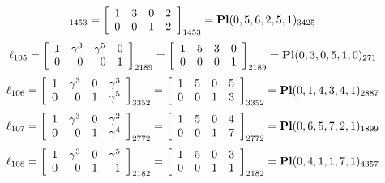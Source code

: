 \documentclass{article}
\begin{document}
{$$_{1453}
=
\left[
\begin{array}{*{4}c}
1  & 3  & 0  & 2\\
0  & 0  & 1  & 2\\
\end{array}
\right]_{1453}
={\rm\bf Pl}(0,5,6,2,5,1 )_{3425}$$
$$
\ell_{105} = 
\left[
\begin{array}{*{4}{r}}
1 & \gamma^{3} & \gamma^{5} & 0\\
0 & 0 & 0 & 1\\
\end{array}
\right]
_{2189}
=
\left[
\begin{array}{*{4}c}
1  & 5  & 3  & 0\\
0  & 0  & 0  & 1\\
\end{array}
\right]_{2189}
={\rm\bf Pl}(0,3,0,5,1,0 )_{271}$$
$$
\ell_{106} = 
\left[
\begin{array}{*{4}{r}}
1 & \gamma^{3} & 0 & \gamma^{3}\\
0 & 0 & 1 & \gamma^{5}\\
\end{array}
\right]
_{3352}
=
\left[
\begin{array}{*{4}c}
1  & 5  & 0  & 5\\
0  & 0  & 1  & 3\\
\end{array}
\right]_{3352}
={\rm\bf Pl}(0,1,4,3,4,1 )_{2887}$$
$$
\ell_{107} = 
\left[
\begin{array}{*{4}{r}}
1 & \gamma^{3} & 0 & \gamma^{2}\\
0 & 0 & 1 & \gamma^{4}\\
\end{array}
\right]
_{2772}
=
\left[
\begin{array}{*{4}c}
1  & 5  & 0  & 4\\
0  & 0  & 1  & 7\\
\end{array}
\right]_{2772}
={\rm\bf Pl}(0,6,5,7,2,1 )_{1899}$$
$$
\ell_{108} = 
\left[
\begin{array}{*{4}{r}}
1 & \gamma^{3} & 0 & \gamma^{5}\\
0 & 0 & 1 & 1\\
\end{array}
\right]
_{2182}
=
\left[
\begin{array}{*{4}c}
1  & 5  & 0  & 3\\
0  & 0  & 1  & 1\\
\end{array}
\right]_{2182}
={\rm\bf Pl}(0,4,1,1,7,1 )_{4357}$$
}
\end{document}
